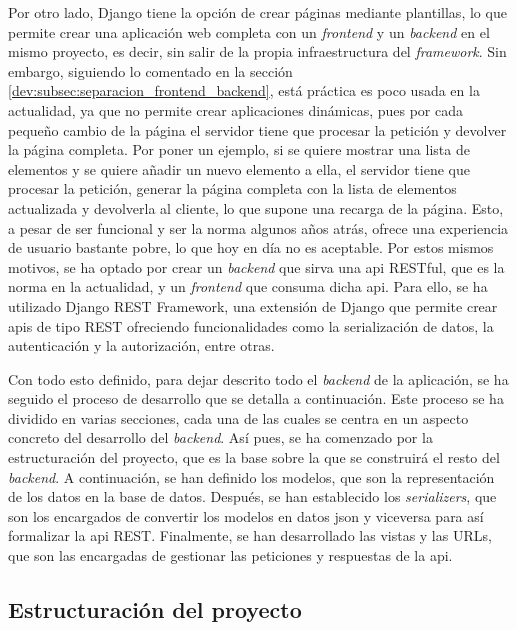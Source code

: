 Por otro lado, Django tiene la opción de crear páginas mediante plantillas, lo que permite crear una aplicación web completa con un \textit{frontend} y un \textit{backend} en el mismo proyecto, es decir, sin salir de la propia infraestructura del \textit{framework}. Sin embargo, siguiendo lo comentado en la sección \ref{dev:subsec:separacion_frontend_backend}, está práctica es poco usada en la actualidad, ya que no permite crear aplicaciones dinámicas, pues por cada pequeño cambio de la página el servidor tiene que procesar la petición y devolver la página completa. Por poner un ejemplo, si se quiere mostrar una lista de elementos y se quiere añadir un nuevo elemento a ella, el servidor tiene que procesar la petición, generar la página completa con la lista de elementos actualizada y devolverla al cliente, lo que supone una recarga de la página. Esto, a pesar de ser funcional y ser la norma algunos años atrás, ofrece una experiencia de usuario bastante pobre, lo que hoy en día no es aceptable. Por estos mismos motivos, se ha optado por crear un \textit{backend} que sirva una \gls{api} RESTful, que es la norma en la actualidad, y un \textit{frontend} que consuma dicha \gls{api}. Para ello, se ha utilizado Django REST Framework, una extensión de Django que permite crear \gls{api}s de tipo REST ofreciendo funcionalidades como la serialización de datos, la autenticación y la autorización, entre otras.

Con todo esto definido, para dejar descrito todo el \textit{backend} de la aplicación, se ha seguido el proceso de desarrollo que se detalla a continuación. Este proceso se ha dividido en varias secciones, cada una de las cuales se centra en un aspecto concreto del desarrollo del \textit{backend}. Así pues, se ha comenzado por la estructuración del proyecto, que es la base sobre la que se construirá el resto del \textit{backend}. A continuación, se han definido los modelos, que son la representación de los datos en la base de datos. Después, se han establecido los \textit{serializers}, que son los encargados de convertir los modelos en datos \gls{json} y viceversa para así formalizar la \gls{api} REST. Finalmente, se han desarrollado las vistas y las URLs, que son las encargadas de gestionar las peticiones y respuestas de la \gls{api}.

\subsection{Estructuración del proyecto}
\label{dev:subsec:estructura_proyecto}

